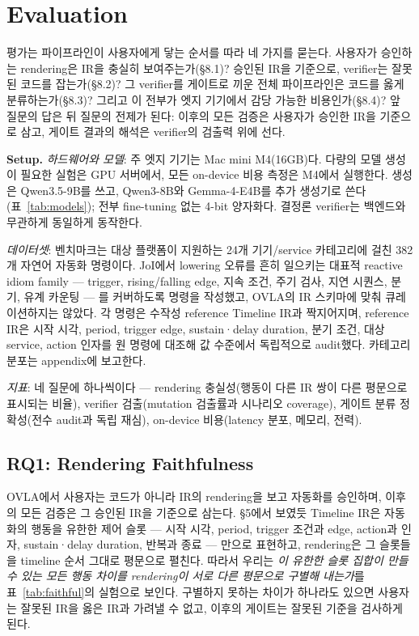 \documentclass[sigconf,nonacm,anonymous,review]{acmart}
\begin{document}
\section{Evaluation}

평가는 파이프라인이 사용자에게 닿는 순서를 따라 네 가지를 묻는다. 사용자가 승인하는 rendering은 IR을 충실히 보여주는가(\S8.1)? 승인된 IR을 기준으로, verifier는 잘못된 코드를 잡는가(\S8.2)? 그 verifier를 게이트로 끼운 전체 파이프라인은 코드를 옳게 분류하는가(\S8.3)? 그리고 이 전부가 엣지 기기에서 감당 가능한 비용인가(\S8.4)? 앞 질문의 답은 뒤 질문의 전제가 된다: 이후의 모든 검증은 사용자가 승인한 IR을 기준으로 삼고, 게이트 결과의 해석은 verifier의 검출력 위에 선다.

\textbf{Setup.} \emph{하드웨어와 모델}: 주 엣지 기기는 Mac mini M4(16GB)다. 다량의 모델 생성이 필요한 실험은 GPU 서버에서, 모든 on-device 비용 측정은 M4에서 실행한다. 생성은 Qwen3.5-9B를 쓰고, Qwen3-8B와 Gemma-4-E4B를 추가 생성기로 쓴다(표~\ref{tab:models}); 전부 fine-tuning 없는 4-bit 양자화다. 결정론 verifier는 백엔드와 무관하게 동일하게 동작한다.

\emph{데이터셋}: 벤치마크는 대상 플랫폼이 지원하는 24개 기기/service 카테고리에 걸친 382개 자연어 자동화 명령이다. JoI에서 lowering 오류를 흔히 일으키는 대표적 reactive idiom family — trigger, rising/falling edge, 지속 조건, 주기 검사, 지연 시퀀스, 분기, 유계 카운팅 — 를 커버하도록 명령을 작성했고, OVLA의 IR 스키마에 맞춰 큐레이션하지는 않았다. 각 명령은 수작성 reference Timeline IR과 짝지어지며, reference IR은 시작 시각, period, trigger edge, sustain·delay duration, 분기 조건, 대상 service, action 인자를 원 명령에 대조해 값 수준에서 독립적으로 audit했다. 카테고리 분포는 appendix에 보고한다.

\emph{지표}: 네 질문에 하나씩이다 — rendering 충실성(행동이 다른 IR 쌍이 다른 평문으로 표시되는 비율), verifier 검출(mutation 검출률과 시나리오 coverage), 게이트 분류 정확성(전수 audit과 독립 재심), on-device 비용(latency 분포, 메모리, 전력).

\subsection{RQ1: Rendering Faithfulness}

OVLA에서 사용자는 코드가 아니라 IR의 rendering을 보고 자동화를 승인하며, 이후의 모든 검증은 그 승인된 IR을 기준으로 삼는다. \S5에서 보였듯 Timeline IR은 자동화의 행동을 유한한 제어 슬롯 — 시작 시각, period, trigger 조건과 edge, action과 인자, sustain·delay duration, 반복과 종료 — 만으로 표현하고, rendering은 그 슬롯들을 timeline 순서 그대로 평문으로 펼친다. 따라서 우리는 \emph{이 유한한 슬롯 집합이 만들 수 있는 모든 행동 차이를 rendering이 서로 다른 평문으로 구별해 내는가}를 표~\ref{tab:faithful}의 실험으로 보인다. 구별하지 못하는 차이가 하나라도 있으면 사용자는 잘못된 IR을 옳은 IR과 가려낼 수 없고, 이후의 게이트는 잘못된 기준을 검사하게 된다.
\end{document}
